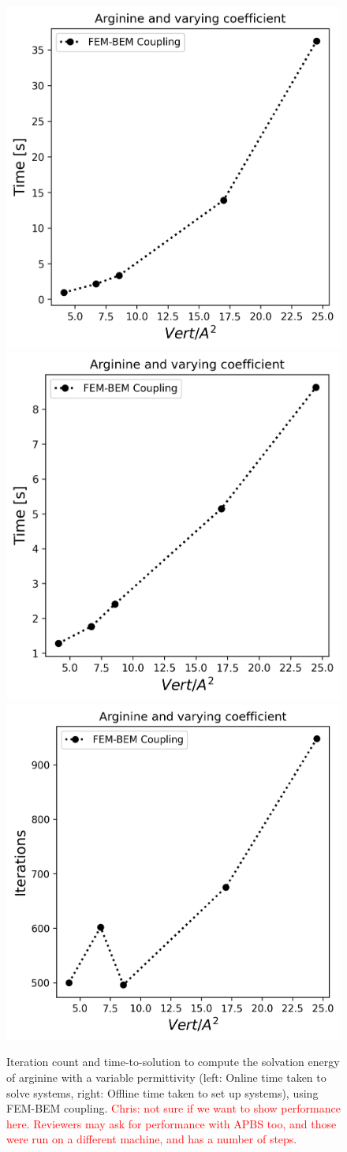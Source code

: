 \begin{figure}
\centering
\includegraphics[width=0.45\linewidth]{DolfinX_Arginine2_varying_coeff_time.png}
\includegraphics[width=0.45\linewidth]{DolfinX_Arginine2_varying_coeff_set_time.png}
\includegraphics[width=0.45\linewidth]{DolfinX_Arginine2_varying_coeff_iter.png}
\caption{Iteration count and time-to-solution to compute the solvation energy of arginine with a variable permittivity (left: Online time taken to solve systems, right: Offline time taken to set up systems), using FEM-BEM coupling. %
\textcolor{red}{Chris: not sure if we want to show performance here. Reviewers may ask for performance with APBS too, and those were run on a different machine, and has a number of steps.}}
\label{fig:arg2_variable}
\end{figure}


